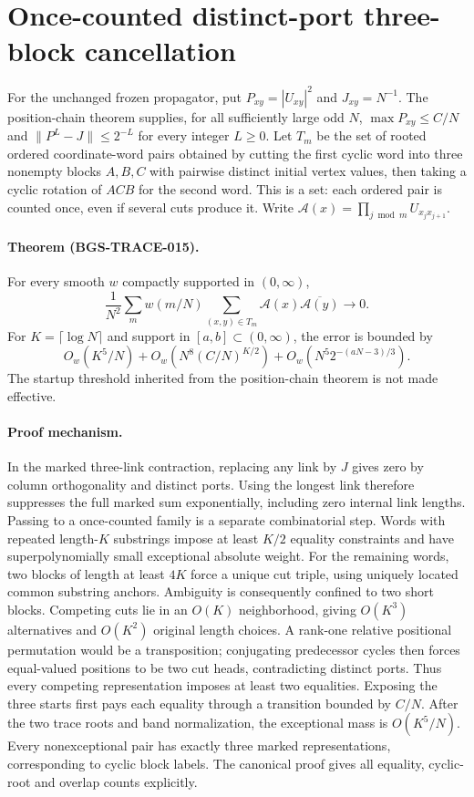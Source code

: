 \section{Once-counted distinct-port three-block cancellation}
\label{sec:three-block-unmarking}
For the unchanged frozen propagator, put $P_{xy}=|U_{xy}|^2$ and
$J_{xy}=N^{-1}$. The position-chain theorem supplies, for all sufficiently
large odd $N$, $\max P_{xy}\leq C/N$ and
$\|P^L-J\|\leq 2^{-L}$ for every integer $L\geq0$.
Let $T_m$ be the set of rooted ordered coordinate-word pairs obtained by
cutting the first cyclic word into three nonempty blocks $A,B,C$ with
pairwise distinct initial vertex values, then taking a cyclic rotation of
$ACB$ for the second word. This is a set: each ordered pair is counted once,
even if several cuts produce it. Write
$\mathcal A(x)=\prod_{j\bmod m}U_{x_jx_{j+1}}$.

\paragraph{Theorem (BGS-TRACE-015).}
For every smooth $w$ compactly supported in $(0,\infty)$,
\[
 \frac1{N^2}\sum_m w(m/N)
 \sum_{(x,y)\in T_m}\mathcal A(x)\overline{\mathcal A(y)}\longrightarrow0.
\]
For $K=\lceil\log N\rceil$ and support in $[a,b]\subset(0,\infty)$,
the error is bounded by
\[
 O_w(K^5/N)+O_w\!\left(N^8(C/N)^{K/2}\right)
 +O_w\!\left(N^5 2^{-(aN-3)/3}\right).
\]
The startup threshold inherited from the position-chain theorem is not
made effective.

\paragraph{Proof mechanism.}
In the marked three-link contraction, replacing any link by $J$ gives
zero by column orthogonality and distinct ports. Using the longest link
therefore suppresses the full marked sum exponentially, including zero
internal link lengths. Passing to a once-counted family is a separate
combinatorial step. Words with repeated length-$K$ substrings impose
at least $K/2$ equality constraints and have superpolynomially small
exceptional absolute weight. For the remaining words, two blocks of
length at least $4K$ force a unique cut triple, using uniquely located
common substring anchors. Ambiguity is consequently confined to two
short blocks. Competing cuts lie in an $O(K)$ neighborhood, giving
$O(K^3)$ alternatives and $O(K^2)$ original length choices.
A rank-one relative positional permutation would be a transposition;
conjugating predecessor cycles then forces equal-valued positions to be
two cut heads, contradicting distinct ports. Thus every competing
representation imposes at least two equalities. Exposing the three starts
first pays each equality through a transition bounded by $C/N$. After the
two trace roots and band normalization, the exceptional mass is
$O(K^5/N)$. Every nonexceptional pair has exactly three marked
representations, corresponding to cyclic block labels. The canonical
proof gives all equality, cyclic-root and overlap counts explicitly.

